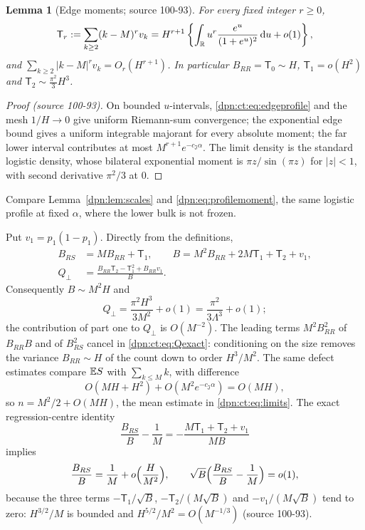 \documentclass[11pt]{article}
\numberwithin{equation}{section}
\newtheorem{lemma}[theorem]{Lemma}
\theoremstyle{definition}\newtheorem{definition}[theorem]{Definition}
\theoremstyle{remark}\newtheorem{remark}[theorem]{Remark}
\newcommand{\dd}{\,\mathrm d}\newcommand{\ii}{\mathrm i}
\newcommand{\src}[1]{\textup{(source #1)}}
\begin{document}
\begin{lemma}[Edge moments; source 100-93]\label{dpn:ct:lem:moments}
For every fixed integer $r\ge0$,
\begin{equation}\label{dpn:ct:eq:moments}
 \mathsf T_r:=\sum_{k\ge2}(k-M)^rv_k
 =H^{r+1}\left\{\int_\R u^r\frac{e^u}{(1+e^u)^2}\dd u+o(1)\right\},
\end{equation}
and $\sum_{k\ge2}|k-M|^rv_k=O_r(H^{r+1})$.  In particular $B_{RR}=\mathsf T_0\sim H$,
$\mathsf T_1=o(H^2)$ and $\mathsf T_2\sim\frac{\pi^2}3H^3$.
\end{lemma}
\begin{proof}[Proof \src{100-93}]
On bounded $u$-intervals, \eqref{dpn:ct:eq:edgeprofile} and the mesh
$1/H\to0$ give uniform Riemann-sum convergence; the exponential edge bound
gives a uniform integrable majorant for every absolute moment; the far lower
interval contributes at most $M^{r+1}e^{-c_{\mathfrak J}\alpha}$.  The limit
density is the standard logistic density, whose bilateral exponential moment
is $\pi z/\sin(\pi z)$ for $|z|<1$, with second derivative $\pi^2/3$ at $0$.
\end{proof}
Compare Lemma~\ref{dpn:lem:scales} and \eqref{dpn:eq:profilemoment}, the same
logistic profile at fixed $\alpha$, where the lower bulk is not frozen.

Put $v_1=p_1(1-p_1)$.  Directly from the definitions,
\begin{align}
 B_{RS}&=MB_{RR}+\mathsf T_1,\qquad
 B=M^2B_{RR}+2M\mathsf T_1+\mathsf T_2+v_1,\label{dpn:ct:eq:CV}\\
 Q_\perp&=\frac{B_{RR}\mathsf T_2-\mathsf T_1^2+B_{RR}v_1}{B}.\label{dpn:ct:eq:Qexact}
\end{align}
Consequently $B\sim M^2H$ and
\begin{equation}\label{dpn:ct:eq:Qlimit}
 Q_\perp=\frac{\pi^2H^3}{3M^2}+o(1)=\frac{\pi^2}{3\Lambda^3}+o(1);
\end{equation}
the contribution of part one to $Q_\perp$ is $O(M^{-2})$.  The leading terms
$M^2B_{RR}^2$ of $B_{RR}B$ and of $B_{RS}^2$ cancel in \eqref{dpn:ct:eq:Qexact}:
conditioning on the size removes the variance $B_{RR}\sim H$ of the count down
to order $H^3/M^2$.  The same defect estimates compare $\mathbb E S$ with
$\sum_{k\le M}k$, with difference
\begin{equation}\label{dpn:ct:eq:meanerror}
 O(MH+H^2)+O(M^2e^{-c_{\mathfrak J}\alpha})=O(MH),
\end{equation}
so $n=M^2/2+O(MH)$, the mean estimate in \eqref{dpn:ct:eq:limits}.  The exact
regression-centre identity
\begin{equation}\label{dpn:ct:eq:betadiff}
 \frac{B_{RS}}B-\frac1M=-\frac{M\mathsf T_1+\mathsf T_2+v_1}{MB}
\end{equation}
implies
\begin{equation}\label{dpn:ct:eq:centeraccuracy}
 \frac{B_{RS}}B=\frac1M+o\Bigl(\frac H{M^2}\Bigr),\qquad
 \sqrt B\Bigl(\frac{B_{RS}}B-\frac1M\Bigr)=o(1),
\end{equation}
because the three terms $-\mathsf T_1/\sqrt B$, $-\mathsf T_2/(M\sqrt B)$ and
$-v_1/(M\sqrt B)$ tend to zero: $H^{3/2}/M$ is bounded and
$H^{5/2}/M^2=O(M^{-1/3})$ \src{100-93}.
\end{document}
